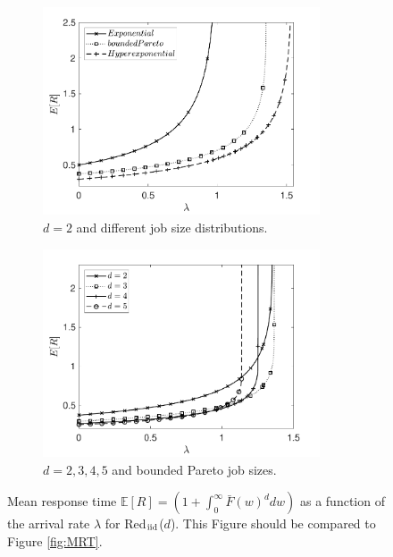 \documentclass[12pt]{report}
\newcommand{\Redind}{Red$_{\textup{iid}}$($d$)}
\newcommand{\E}{\mathbb{E}}
\begin{document}
\begin{figure}[t]
\begin{subfigure}{.45\textwidth}
\begin{center}
\includegraphics[width=0.9\textwidth]{figures/Chapter3/plot_MRT_ifo_lam_diffdists_ind.pdf}
\caption{$d=2$ and different job size distributions.}
\label{fig:MRTdiffjobsizes_ind}
\end{center}
\end{subfigure}
\begin{subfigure}{.45\textwidth}
\begin{center}
\includegraphics[width=0.9\textwidth]{figures/Chapter3/plot_MRT_ifo_lam_diffd_ind.pdf}
\caption{$d=2,3,4,5$ and bounded Pareto job sizes.}
\label{fig:MRTdiffd_ind}
\end{center}
\end{subfigure}
\caption{Mean response time $\E[R] =\left(1+\int_0^\infty \bar{F}(w)^d dw\right)$ as a function of the arrival rate $\lambda$ for \Redind . This Figure should be compared to Figure \ref{fig:MRT}.}
\label{fig:MRT_ind}
\end{figure}
\end{document}
